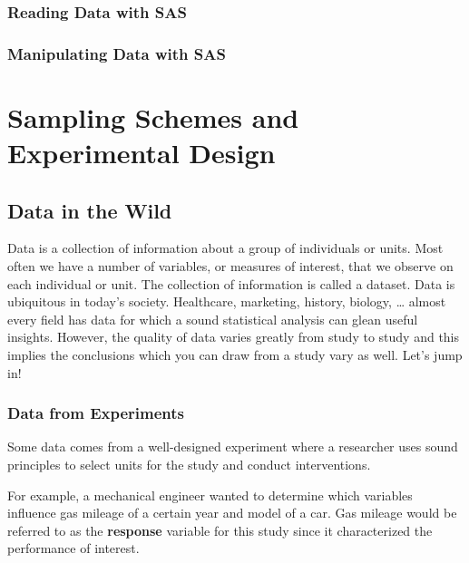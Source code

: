 \documentclass[
]{book}
\theoremstyle{definition}
\theoremstyle{definition}
\theoremstyle{definition}
\theoremstyle{remark}
\begin{document}
\hypertarget{reading-data-with-sas}{%
\subsection{Reading Data with SAS}\label{reading-data-with-sas}}

\hypertarget{manipulating-data-with-sas}{%
\subsection{Manipulating Data with SAS}\label{manipulating-data-with-sas}}

\hypertarget{sampling-schemes-and-experimental-design}{%
\chapter{Sampling Schemes and Experimental Design}\label{sampling-schemes-and-experimental-design}}

\hypertarget{data-in-the-wild}{%
\section{Data in the Wild}\label{data-in-the-wild}}

Data is a collection of information about a group of individuals or units. Most often we have a number of variables, or measures of interest, that we observe on each individual or unit. The collection of information is called a dataset. Data is ubiquitous in today's society. Healthcare, marketing, history, biology, \ldots{} almost every field has data for which a sound statistical analysis can glean useful insights. However, the quality of data varies greatly from study to study and this implies the conclusions which you can draw from a study vary as well. Let's jump in!

\hypertarget{data-from-experiments}{%
\subsection{Data from Experiments}\label{data-from-experiments}}

Some data comes from a well-designed experiment where a researcher uses sound principles to select units for the study and conduct interventions.

For example, a mechanical engineer wanted to determine which variables influence gas mileage of a certain year and model of a car. Gas mileage would be referred to as the \textbf{response} variable for this study since it characterized the performance of interest.
\end{document}
